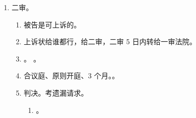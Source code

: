 \begin{enumerate}
        \begin{kk}{简易程序}
          \begin{enumerate}
            \item 分为法定简易、约定简易。选项说可以用简易程序请保持警惕！！
            \item {}。背。
                  \begin{enumerate}
                    \item 事、争、权、义为前提；一审、级别无要求。事实清晰、争议不大、权利义务明确。
                    \item 信息公开、当场做；双方约定、钱 2 千。
                    \item 通知方式可从简，裁判文书要严肃。
                    \item 举证期限可协商，不超 15 日法院准。
                    \item 裁定转化知双方，审期仍从立案算。刑诉是转化之日起算。
                    \item 独任 45 不得延，择期判。
                  \end{enumerate}
            \item 只有处罚、诉讼有简易程序。。
            \item {}。
            \item {}。
            \item {}。
          \end{enumerate}
        \end{kk}
  \item 二审。
        \begin{enumerate}
          \item 被告是可上诉的。
          \item 上诉状给谁都行，给二审，二审 5 日内转给一审法院。
          \item {}。
                。
          \item 合议庭、原则开庭、3 个月。。
          \item 判决。考遗漏请求。
                \begin{enumerate}
                  \item {}。

\end{enumerate}
\end{enumerate}
\end{enumerate}

